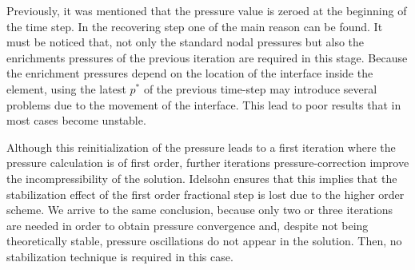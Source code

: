 Previously, it was mentioned that the pressure value is zeroed at the beginning of the time step. In the recovering step one of the main reason can be found. It must be noticed that, not only the standard nodal pressures but also the enrichments pressures of the previous iteration are required in this stage. Because the enrichment pressures depend on the location of the interface inside the element, using the latest $p^*$ of the previous time-step may introduce several problems due to the movement of the interface. This lead to poor results that in most cases become unstable.

Although this reinitialization of the pressure leads to a first iteration where the pressure calculation is of first order, further iterations pressure-correction improve the incompressibility of the solution. Idelsohn\cite{Idelsohn13c} ensures that this implies that the stabilization effect of the first order fractional step is lost due to the higher order scheme. We arrive to the same conclusion, because only two or three iterations are needed in order to obtain pressure convergence and, despite not being theoretically stable, pressure oscillations do not appear in the solution. Then, no stabilization technique is required in this case.